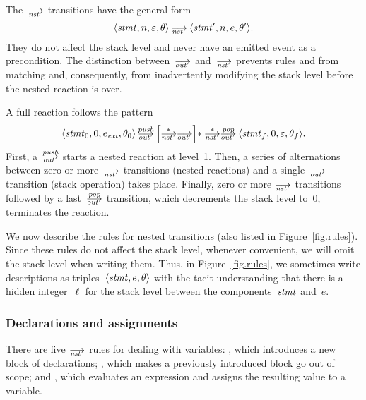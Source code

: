 The~$\nst$ transitions have the general form
\[
\<\stmt,n,\nil,\theta>\nst\<\stmt',n,e,\theta'>.
\]
They do not affect the stack level and never have an emitted event as a
precondition.  The distinction between~$\out$ and~$\nst$ prevents rules
 and  from matching and, consequently, from inadvertently
modifying the stack level before the nested reaction is over.

A full reaction follows the pattern
\begin{align*}
  \<\stmt_0,0,e_\ext,\theta_0>\outpush
  {\Big[{\nst[*]}{\out}\Big]{*}}
  \null\mathbin{\nst[*]\outpop}\<\stmt_f,0,\nil,\theta_f>.
\end{align*}
First, a~$\outpush$ starts a nested reaction at level~1.  Then, a series of
alternations between zero or more~$\nst$ transitions (nested reactions) and
a single~$\out$ transition (stack operation) takes place.  Finally, zero or
more $\nst$ transitions followed by a last~$\outpop$ transition, which
decrements the stack level to~0, terminates the reaction.

We now describe the rules for nested transitions (also listed in
Figure~\ref{fig.rules}).  Since these rules do not affect the stack level,
whenever convenient, we will omit the stack level when writing them.  Thus,
in Figure~\ref{fig.rules}, we sometimes write descriptions as
triples~$\<\stmt,e,\theta>$ with the tacit understanding that there is a
hidden integer~$\ell$ for the stack level between the components~$\mathit{stmt}$
and~$e$.

\subsubsection*{Declarations and assignments}

There are five $\nst$ rules for dealing with variables: , which
introduces a new block of declarations; , which makes a
previously introduced block go out of scope; and , which evaluates
an expression and assigns the resulting value to a variable.

